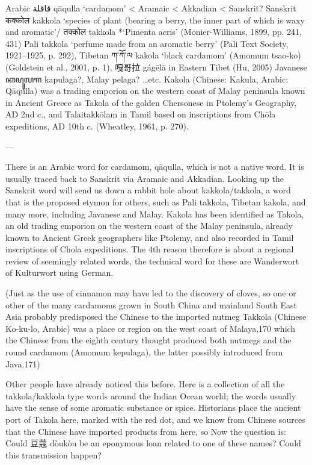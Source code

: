 \documentclass[12pt]{article}
\begin{document}
Arabic قاقلة qāqulla ‘cardamom’ < Aramaic < Akkadian < Sanskrit?
Sanskrit कक्कोल kakkola ‘species of plant (bearing a berry, the inner part of which is waxy and aromatic’/ तक्कोल takkola *‘Pimenta acris’ (Monier-Williams, 1899, pp. 241, 431)
Pali takkola ‘perfume made from an aromatic berry’ (Pali Text Society, 1921–1925, p. 292),
Tibetan ཀ་ཀོ་ལ kakola ‘black cardamom’ (Amomum tsao-ko) (Goldstein et al., 2001, p. 1), 嘎哥拉 gágēlā in Eastern Tibet (Hu, 2005)
Javanese ꦏꦥꦸꦭꦒ kapulaga?, Malay pelaga? …etc.
Kakola (Chinese: Kakula, Arabic: Qāqulla) was a trading emporion on the western coast of Malay peninsula known in Ancient Greece as Takola of the golden Chersonese in Ptolemy’s Geography, AD 2nd c., and Talaitakkōlam in Tamil based on inscriptions from Chōla expeditions, AD 10th c. (Wheatley, 1961, p. 270).

---

There is an Arabic word for cardamom, qāqulla, which is not a native word. It is usually traced back to Sanskrit via Aramaic and Akkadian.
Looking up the Sanskrit word will send us down a rabbit hole about kakkola/takkola, a word that is the proposed etymon for others, such as Pali takkola, Tibetan kakola, and many more, including Javanese and Malay.
Kakola has been identified as Takola, an old trading emporion on the western coast of the Malay peninsula, already known to Ancient Greek geographers like Ptolemy, and also recorded in Tamil inscriptions of Chola expeditions.
The 4th reason therefore is about a regional review of seemingly related words, the technical word for these are Wanderwort of Kulturwort using German. 


(Just as the use of cinnamon may have led to the discovery of cloves, so one or other of the many cardamoms grown in South China and mainland South East Asia probably predisposed the Chinese to the imported nutmeg Takkola (Chinese Ko-ku-lo, Arabic) was a place or region on the west coast of Malaya,170 which the Chinese from the eighth century thought produced both nutmegs and the round cardamom (Amomum kepulaga), the latter possibly introduced from Java.171)



Other people have already noticed this before. Here is a collection of all the takkola/kakkola type words around the Indian Ocean world; the words usually have the sense of some aromatic substance or spice. 
Historians place the ancient port of Takola here, marked with the red dot, and we know from Chinese sources that the Chinese have imported products from here, so
Now the question is: Could 豆蔻 dòukòu be an eponymous loan related to one of these names? Could this transmission happen?






\printbibliography
\end{document}
